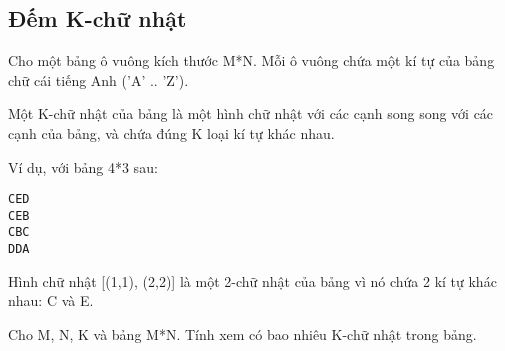 \subsection{   Đếm K-chữ nhật  }

   Cho một bảng ô vuông kích thước M*N. Mỗi ô vuông chứa một kí tự của bảng chữ cái tiếng Anh ('A' .. 'Z').  

   Một K-chữ nhật của bảng là một hình chữ nhật với các cạnh song song với các cạnh của bảng, và chứa đúng K loại kí tự khác nhau.  

   Ví dụ, với bảng 4*3 sau:  
\begin{verbatim}
CED
CEB
CBC
DDA
\end{verbatim}

   Hình chữ nhật [(1,1), (2,2)] là một 2-chữ nhật của bảng vì nó chứa 2 kí tự khác nhau: C và E.  

   Cho M, N, K và bảng M*N. Tính xem có bao nhiêu K-chữ nhật trong bảng.  

\